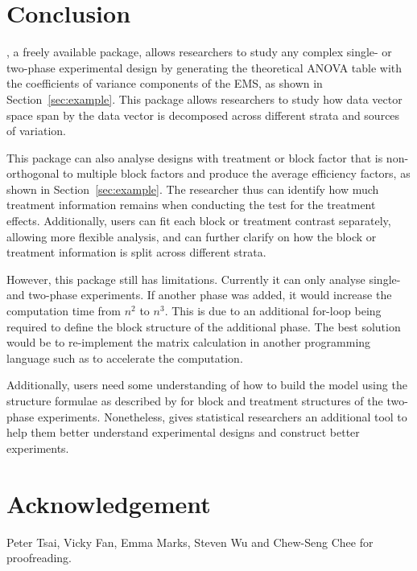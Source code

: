 \documentclass[article]{jss}
\begin{document}
\section[Conclusion]{Conclusion}
, a freely available  package, allows researchers to study any complex single- or two-phase experimental design by generating the theoretical ANOVA table with the coefficients of variance components of the EMS, as shown in Section~\ref{sec:example}. This package allows researchers to study how data vector space span by the data vector is decomposed across different strata and sources of variation.

This package can also analyse designs with treatment or block factor that is non-orthogonal to multiple block factors and produce the average efficiency factors, as shown in Section~\ref{sec:example}. The researcher thus can identify how much treatment information remains when conducting the test for the treatment effects. Additionally, users can fit each block or treatment contrast separately, allowing more flexible analysis, and can further clarify on how the block or treatment information is split across different strata.

However, this package still has limitations. Currently it can only analyse single- and two-phase experiments. If another phase was added, it would increase the computation time from $n^2$ to $n^3$. This is due to an additional for-loop being required to define the block structure of the additional phase. The best solution would be to re-implement the matrix calculation in another programming language such as  to accelerate the computation.

Additionally, users need some understanding of how to build the model using the structure formulae as described by \cite{Wilkinson1973} for block and treatment structures of the two-phase experiments. Nonetheless,  gives statistical researchers an additional tool to help them better understand experimental designs and construct better experiments.

\section*{Acknowledgement}
Peter Tsai, Vicky Fan, Emma Marks, Steven Wu and Chew-Seng Chee for proofreading.


\end{document}
